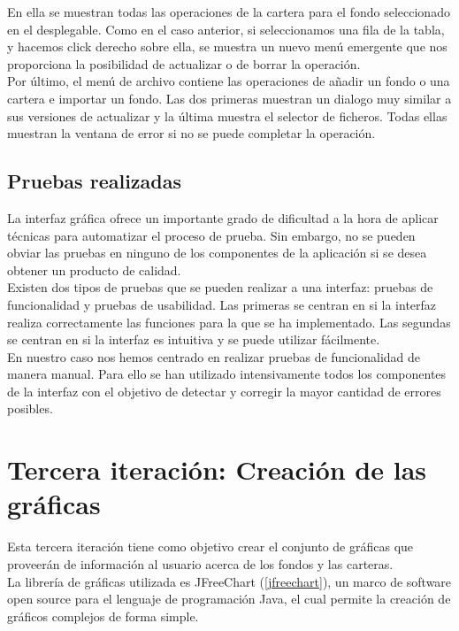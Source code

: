 \documentclass[12pt, a4paper]{book}
\begin{document}
En ella se muestran todas las operaciones de la cartera para el fondo seleccionado en el desplegable. Como en el caso anterior, si seleccionamos una fila de la tabla, y hacemos click derecho sobre ella, se muestra un nuevo menú emergente que nos proporciona la posibilidad de actualizar o de borrar la operación.
\\

Por último, el menú de archivo contiene las operaciones de añadir un fondo o una cartera e importar un fondo. Las dos primeras muestran un dialogo muy similar a sus versiones de actualizar y la última muestra el selector de ficheros. Todas ellas muestran la ventana de error si no se puede completar la operación.


\subsection{Pruebas realizadas}

La interfaz gráfica ofrece un importante grado de dificultad a la hora de aplicar técnicas para automatizar el proceso de prueba. Sin embargo, no se pueden obviar las pruebas en ninguno de los componentes de la aplicación si se desea obtener un producto de calidad.\\

Existen dos tipos de pruebas que se pueden realizar a una interfaz: pruebas de funcionalidad y pruebas de usabilidad. Las primeras se centran en si la interfaz realiza correctamente las funciones para la que se ha implementado. Las segundas se centran en si la interfaz es intuitiva y se puede utilizar fácilmente.\\

En nuestro caso nos hemos centrado en realizar pruebas de funcionalidad de manera manual. Para ello se han utilizado intensivamente todos los componentes de la interfaz con el objetivo de detectar y corregir la mayor cantidad de errores posibles.

\newpage
\section{Tercera iteración: Creación de las gráficas}

Esta tercera iteración tiene como objetivo crear el conjunto de gráficas que proveerán de información al usuario acerca de los fondos y las carteras.\\

La librería de gráficas utilizada es JFreeChart (\ref{jfreechart}), un marco de software open source para el lenguaje de programación Java, el cual permite la creación de gráficos complejos de forma simple.
\end{document}
